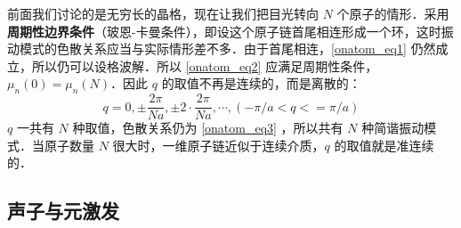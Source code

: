 前面我们讨论的是无穷长的晶格，现在让我们把目光转向 $N$ 个原子的情形．采用\textbf{周期性边界条件}（玻恩-卡曼条件），即设这个原子链首尾相连形成一个环，这时振动模式的色散关系应当与实际情形差不多．由于首尾相连，\autoref{onatom_eq1} 仍然成立，所以仍可以设格波解．所以 \autoref{onatom_eq2} 应满足周期性条件，$\mu_n(0)=\mu_n(N)$．因此 $q$ 的取值不再是连续的，而是离散的：
\begin{equation}
q=0,\pm \frac{2\pi}{Na},\pm 2\cdot \frac{2\pi}{Na},\cdots, (-\pi/a<q<=\pi/a)
\end{equation}
$q$ 一共有 $N$ 种取值，色散关系仍为 \autoref{onatom_eq3} ，所以共有 $N$ 种简谐振动模式．当原子数量 $N$ 很大时，一维原子链近似于连续介质，$q$ 的取值就是准连续的．
\subsection{声子与元激发}



